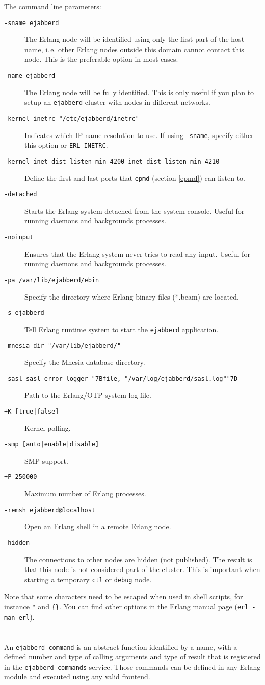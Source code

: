 \documentclass[a4paper,10pt]{book}
\newcommand{\makesection}[2]{ \aname{#1}{} \section{\ahrefloc{#1}{#2}} \label{#1} }
\newcommand{\bracehack}{\def\{{\char"7B}\def\}{\char"7D}}
\newcommand{\titem}[1]{\item[\bracehack\texttt{#1}]}
\newcommand{\term}[1]{\texttt{#1}}
\newcommand{\shell}[1]{\texttt{#1}}
\newcommand{\ejabberd}{\texttt{ejabberd}}
\begin{document}
The command line parameters:
\begin{description}
  \titem{-sname ejabberd}
	The Erlang node will be identified using only the first part
	of the host name, i.\,e. other Erlang nodes outside this domain cannot contact
	this node. This is the preferable option in most cases.
  \titem{-name ejabberd}
	The Erlang node will be fully identified.
    This is only useful if you plan to setup an \ejabberd{} cluster with nodes in different networks.
  \titem{-kernel inetrc "/etc/ejabberd/inetrc"}
	Indicates which IP name resolution to use.
	If using \term{-sname}, specify either this option or \term{ERL\_INETRC}.
  \titem{-kernel inet\_dist\_listen\_min 4200 inet\_dist\_listen\_min 4210}
	Define the first and last ports that \term{epmd} (section \ref{epmd}) can listen to.
  \titem{-detached}
        Starts the Erlang system detached from the system console.
	Useful for running daemons and backgrounds processes.
  \titem{-noinput}
	Ensures that the Erlang system never tries to read any input.
	Useful for running daemons and backgrounds processes.
  \titem{-pa /var/lib/ejabberd/ebin}
	Specify the directory where Erlang binary files (*.beam) are located.
  \titem{-s ejabberd}
	Tell Erlang runtime system to start the \ejabberd{} application.
  \titem{-mnesia dir "/var/lib/ejabberd/"}
	Specify the Mnesia database directory.
  \titem{-sasl sasl\_error\_logger \{file, "/var/log/ejabberd/sasl.log"\}}
	Path to the Erlang/OTP system log file.
  \titem{+K [true|false]}
	Kernel polling.
  \titem{-smp [auto|enable|disable]}
	SMP support.
  \titem{+P 250000}
	Maximum number of Erlang processes.
  \titem{-remsh ejabberd@localhost}
	Open an Erlang shell in a remote Erlang node.
  \titem{-hidden}
	The connections to other nodes are hidden (not published).
	The result is that this node is not considered part of the cluster.
	This is important when starting a temporary \term{ctl} or \term{debug} node.
\end{description}
Note that some characters need to be escaped when used in shell scripts, for instance \verb|"| and \verb|{}|.
You can find other options in the Erlang manual page (\shell{erl -man erl}).

\makesection{eja-commands}{\ejabberd{} Commands}

An \term{ejabberd command} is an abstract function identified by a name,
with a defined number and type of calling arguments and type of result
that is registered in the \term{ejabberd\_commands} service.
Those commands can be defined in any Erlang module and executed using any valid frontend.
\end{document}
